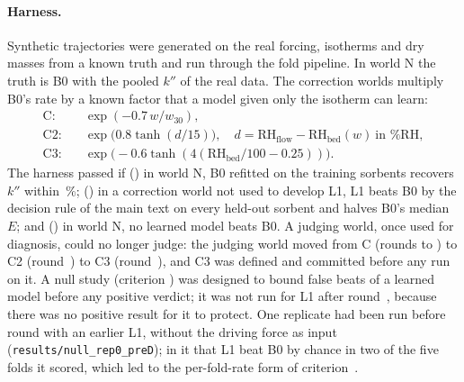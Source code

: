\documentclass[11pt]{article}
\newcommand{\kpp}{k''}
\newcommand{\RHf}{\mathrm{RH}_{\mathrm{flow}}}
\newcommand{\RHb}{\mathrm{RH}_{\mathrm{bed}}}
\begin{document}
\paragraph{Harness.} Synthetic trajectories were generated on the real forcing, isotherms and dry masses from a known
truth and run through the fold pipeline. In world N the truth is B0 with the pooled $\kpp$ of the real data. The
correction worlds multiply B0's rate by a known factor that a model given only the isotherm can learn:
\begin{align}
\text{C:}\quad & \exp(-0.7\,w/w_{30}), \\
\text{C2:}\quad & \exp\bigl(0.8\tanh(d/15)\bigr), \quad d = \RHf - \RHb(w)\ \text{in \% RH}, \\
\text{C3:}\quad & \exp\bigl(-0.6\tanh(4(\RHb/100 - 0.25))\bigr).
\end{align}
The harness passed if () in world N, B0 refitted on the training sorbents recovers $\kpp$ within
\,\%; () in a correction world not used to develop L1, L1 beats B0 by the decision rule of the main
text on every held-out sorbent and halves B0's median $E$; and () in world N, no learned model beats B0. A judging
world, once used for diagnosis, could no longer judge: the judging world moved from C (rounds  to ) to C2
(round~) to C3 (round~), and C3 was defined and committed before any run on it. A null study (criterion
) was designed to bound false beats of a learned model before any positive verdict; it was not run for L1 after
round~, because there was no positive result for it to protect. One replicate had been run before round
 with an earlier L1, without the driving force as input (\texttt{results/null\_rep0\_preD}); in it that L1 beat
B0 by chance in two of the five folds it scored, which led to the per-fold-rate form of criterion~.
\end{document}
